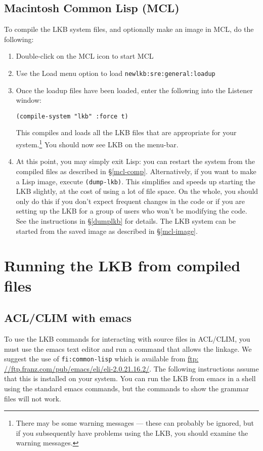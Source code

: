 \documentclass[12pt]{report}
\begin{document}
\subsection{Macintosh Common Lisp (MCL)}
To compile the LKB system files, and optionally make an image
in MCL, do the following:
\begin{enumerate}
\item Double-click on the MCL icon to start MCL
\item Use the Load menu option to load \verb+newlkb:sre:general:loadup+
\item Once the loadup files have been loaded, enter the following into the
Listener window:
\begin{verbatim}
(compile-system "lkb" :force t)
\end{verbatim}
This compiles and loads all the LKB files that are appropriate for
your system.\footnote{There may be
some warning messages --- these can probably be ignored, but if you subsequently
have problems using the LKB, you should examine the
warning messages.}
You
should now see LKB on the menu-bar.
\item
At this point, you may simply exit Lisp:
you can restart the system from the compiled files
as described in \S\ref{mcl-comp}.
Alternatively, if you want to make a Lisp image, execute \verb+(dump-lkb)+.
This simplifies and speeds up starting the LKB slightly, at the cost of
using a lot of file space.
On the whole, you should only do this if you don't expect
frequent changes in the code or if you are setting up the LKB for
a group of users who won't be modifying the code.
See the instructions in \S\ref{dumplkb} for details.
The LKB system can be started from the saved image as described in 
\S\ref{mcl-image}.
\end{enumerate}


\section{Running the LKB from compiled files}
\label{compiled}


\subsection{ACL/CLIM with emacs}
\label{acl-emacs}

To use the LKB commands for interacting with source
files in ACL/CLIM, you must use the emacs text editor and
run a command that allows the linkage.  We suggest
the use of {\tt fi:common-lisp} which is available
from \href{ftp: //ftp.franz.com/pub/emacs/eli/eli-2.0.21.16.2/}{ftp: //ftp.franz.com/pub/emacs/eli/eli-2.0.21.16.2/}.  The following
instructions assume that this is installed on your system.
You can run the LKB from emacs in a shell using the standard
emacs commands, but the commands to show the grammar files
will not work.
\end{document}
